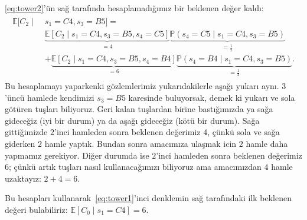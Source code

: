 \eqref{eq:tower2}'\"{u}n sa\u{g} taraf{\i}nda hesaplamad{\i}\u{g}{\i}m{\i}z bir beklenen de\u{g}er kald{\i}:
%
\begin{align*}
    \begin{split}
    \mathbb{E}[C_2 \mid \; &s_1=C4, s_3=B5] = \\
    &\underbrace{\mathbb{E}[C_2 \mid s_1=C4, s_3=B5, s_4=C5]}_{=4} \underbrace{\mathbb{P}(s_4=C5 \mid s_1=C4, s_3=B5)}_{=\frac{1}{2}} \\
    &+ \underbrace{\mathbb{E}[C_2 \mid s_1=C4, s_3=B5, s_4=B4]}_{=6} \underbrace{\mathbb{P}(s_4=B4 \mid s_1=C4, s_3=B5)}_{=\frac{1}{2}}.
    \end{split}
\end{align*}
%
Bu hesaplamay{\i} yaparkenki g\"{o}zlemlerimiz yukar{\i}dakilerle
a\c{s}a\u{g}{\i} yukar{\i} ayn{\i}. $3$'\"{u}nc\"{u} hamlede kendimizi $s_3 =
B5$ karesinde buluyorsak, demek ki yukar{\i} ve sola g\"{o}t\"{u}ren
tu\c{s}lar{\i} biliyoruz. Geri kalan tu\c{s}lardan birine
bast{\i}\u{g}{\i}m{\i}zda ya sa\u{g}a gidece\u{g}iz (iyi bir durum) ya da
a\c{s}a\u{g}{\i} gidece\u{g}iz (k\"{o}t\"{u} bir durum). Sa\u{g}a
gitti\u{g}imizde $2$'inci hamleden sonra beklenen de\u{g}erimiz $4$,
\c{c}\"{u}nk\"{u} sola ve sa\u{g}a giderken $2$ hamle yapt{\i}k. Bundan sonra
amac{\i}m{\i}za ula\c{s}mak icin $2$ hamle daha yapmam{\i}z gerekiyor. Di\u{g}er
durumda ise $2$'inci hamleden sonra beklenen de\u{g}erimiz $6$;
\c{c}\"{u}nk\"{u} art{\i}k tu\c{s}lar{\i} nas{\i}l kullanaca\u{g}{\i}m{\i}z{\i}
biliyoruz ama amac{\i}m{\i}zdan $4$ hamle uzaktay{\i}z: $2+4 = 6$.

Bu hesaplar{\i} kullanarak~\eqref{eq:tower1}'inci denklemin sa\u{g}
taraf{\i}ndaki ilk beklenen de\u{g}eri bulabiliriz: $\mathbb{E}[C_0 \mid s_1=C4] = 6$.

